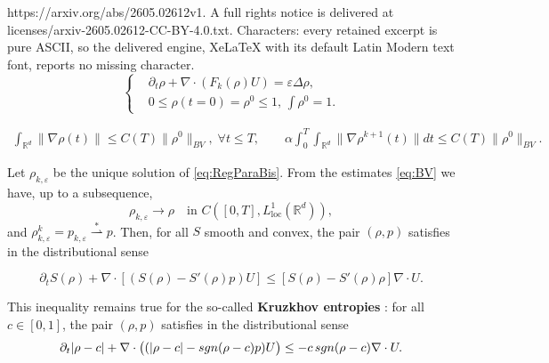 \documentclass[10pt,a4paper]{amsart}
\newcommand {\eps}  {\varepsilon}
\newcommand {\p}   {\partial}
\newcommand {\sgn} { {\rm sgn} }
\newcommand{\R}{\mathbb{R}}
\begin{document}
https://arxiv.org/abs/2605.02612v1. A full rights notice is delivered at licenses/arxiv-2605.02612-CC-BY-4.0.txt. Characters: every retained excerpt is pure ASCII, so the delivered engine, XeLaTeX with its default Latin Modern text font, reports no missing character.
\begin{equation}
\label{eq:RegParaBis}
\left\{\begin{aligned}
&\partial_t \rho + \nabla \cdot (F_k(\rho)U) = \eps \Delta \rho, \\
&0 \leq \rho(t=0) = \rho^0 \leq 1, \, \int \rho^0  =1.
\end{aligned}\right.
\end{equation}

\begin{align} \label{eq:BV} 
\int_{\R^d}\| \nabla \rho(t)\| \leq C(T)\|\rho^0\|_{BV}, \; \forall t \leq T, \qquad \alpha \int_0^T \int_{\R^d}\| \nabla \rho^{k+1} (t)\| dt\leq C(T)\|\rho^0\|_{BV}.
\end{align}

\begin{proposition}
Let $\rho_{k,\eps}$ be the unique solution of \eqref{eq:RegParaBis}.  
From the estimates \eqref{eq:BV} we have, up to a subsequence,
\[
\rho_{k,\eps} \to \rho \quad \text{in } C([0,T],L^1_{\mathrm{loc}}(\mathbb{R}^d)),
\]
and $\rho_{k,\eps}^k=p_{k,\eps} \overset{*}{\rightharpoonup} p$.  
Then, for all $S$ smooth and convex, the pair $(\rho,p)$ satisfies in the distributional sense

\begin{equation}
\label{eq:entropy_limit_gen}
    \p_t S(\rho)+\nabla \cdot [(S(\rho)-S'(\rho)p)U]\le  [S(\rho)-S'(\rho)\rho]\nabla \cdot U.
\end{equation}

This inequality remains true for the so-called \textbf{Kruzkhov entropies} : for all $c\in[0,1]$, the pair $(\rho,p)$ satisfies in the distributional sense
\begin{equation}
\label{eq:entropy_lim_kruz}
\partial_t |\rho-c|
+ \nabla\cdot\big((|\rho-c|-\sgn(\rho-c)p)U\big)
\le -c\,\sgn(\rho-c)\nabla\cdot U .
\end{equation}
\end{proposition}
\end{document}
